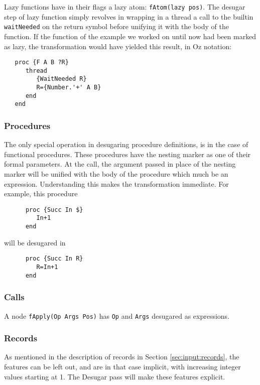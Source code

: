 \documentclass[a4paper]{memoir}
\begin{document}
Lazy functions have in their flags a lazy atom: \lstinline!fAtom(lazy pos)!.
The desugar step of lazy function simply revolves in wrapping in a thread a call to the builtin \lstinline!waitNeeded! on the return symbol before unifying it with the body of the function. If the function of the example we worked on until now had been marked as lazy, the transformation would have yielded this result, in Oz notation:
\begin{lstlisting}
   proc {F A B ?R}
      thread 
         {WaitNeeded R}
         R={Number.'+' A B}
      end
   end
\end{lstlisting} 

\subsubsection{Procedures}\label{sec:arch:desugar:procedures}
The only special operation in desugaring procedure definitions, is in the case
of functional procedures. These procedures have the nesting marker as one of
their formal parameters. At the call, the argument passed in place of the
nesting marker will be unified with the body of the procedure which much be an
expression. 
Understanding this makes the transformation immediate. For example, this procedure
\begin{lstlisting}
      proc {Succ In $}
         In+1
      end
\end{lstlisting}

will be desugared in

\begin{lstlisting}
      proc {Succ In R}
         R=In+1
      end
\end{lstlisting}
\subsubsection{Calls}\label{sec:arch:desugar:calls}
A node \lstinline!fApply(Op Args Pos)! has \lstinline!Op! and \lstinline!Args!
desugared as expressions.
\subsubsection{Records}\label{sec:arch:desugar:records}
As mentioned in the description of records in Section \ref{sec:input:records},
the features can be left out, and are in that case implicit, with increasing
integer values starting at 1. The Desugar pass will make these features explicit.
\end{document}
